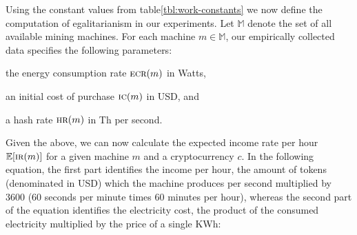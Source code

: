 \begin{table}
  \centering
  \caption{The parameters to our proof-of-work mining simulations. Some depend on the cryptocurrency $c$.}
  \label{tbl:work-constants}
\end{table}


Using the constant values from table\ref{tbl:work-constants} we now define the
computation of egalitarianism in our experiments.  Let $\mathbb{M}$ denote the set of
all available mining machines. For each machine $m \in \mathbb{M}$, our empirically
collected data specifies the following parameters:
\begin{inparaenum}[i)]
    \item the energy consumption rate $\textsc{ecr}(m)$ in Watts,
    \item an initial cost of purchase $\textsc{ic}(m)$ in USD, and
    \item a hash rate $\textsc{hr}(m)$ in Th per second.
\end{inparaenum}
Given the above, we can now calculate the expected income rate per hour
$\mathbb{E}[\textsc{ir}(m)]$ for a given machine $m$ and a cryptocurrency $c$. In the
following equation, the first part identifies the income per hour, \ie the
amount of tokens (denominated in USD) which the machine produces per second
multiplied by $3600$ ($60$ seconds per minute times $60$ minutes per hour),
whereas the second part of the equation identifies the electricity cost, \ie
the product of the consumed electricity multiplied by the price of a single
KWh:

